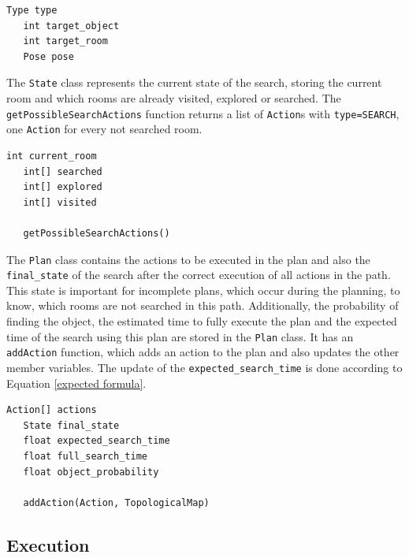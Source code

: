 \begin{minipage}{\linewidth}
\begin{lstlisting}[caption=Action,frame=single, label=Action]
   Type type
   int target_object
   int target_room
   Pose pose
\end{lstlisting}
\end{minipage}

The \texttt{State} class represents the current state of the search, storing the current room and which rooms are already visited, explored or searched. The \texttt{getPossibleSearchActions} function returns a list of \texttt{Action}s with \texttt{type=SEARCH}, one \texttt{Action} for every not searched room.

\begin{minipage}{\linewidth}
\begin{lstlisting}[caption=State,frame=single, label=State]
   int current_room
   int[] searched
   int[] explored
   int[] visited
   
   getPossibleSearchActions()
\end{lstlisting}
\end{minipage}

The \texttt{Plan} class contains the actions to be executed in the plan and also the \texttt{final{\_}state} of the search after the correct execution of all actions in the path. This state is important for incomplete plans, which occur during the planning, to know, which rooms are not searched in this path. Additionally, the probability of finding the object, the estimated time to fully execute the plan and the expected time of the search using this plan are stored in the \texttt{Plan} class. It has an \texttt{addAction} function, which adds an action to the plan and also updates the other member variables. The update of the \texttt{expected{\_}search{\_}time} is done according to Equation \ref{expected formula}.

\begin{minipage}{\linewidth}
\begin{lstlisting}[caption=Plan,frame=single, label=Plan]
   Action[] actions
   State final_state
   float expected_search_time
   float full_search_time
   float object_probability
   
   addAction(Action, TopologicalMap)
\end{lstlisting}
\end{minipage}

\subsection{Execution}

